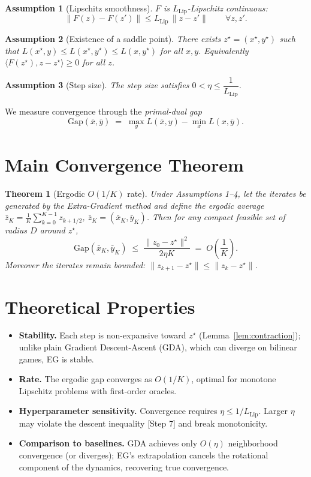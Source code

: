 \documentclass{article}
\newtheorem{theorem}{Theorem}
\newtheorem{assumption}{Assumption}
\begin{document}
\begin{assumption}[Lipschitz smoothness]
$F$ is $L_{\mathrm{Lip}}$-Lipschitz continuous:
\[
\| F(z) - F(z') \| \leq L_{\mathrm{Lip}} \, \| z - z' \| \qquad \forall z,z'.
\]
\end{assumption}

\begin{assumption}[Existence of a saddle point]
There exists $z^\star=(x^\star,y^\star)$ such that
$L(x^\star,y) \le L(x^\star,y^\star) \le L(x,y^\star)$ for all $x,y$.
Equivalently $\langle F(z^\star), z-z^\star\rangle \ge 0$ for all $z$.
\end{assumption}

\begin{assumption}[Step size]
The step size satisfies $0 < \eta \le \dfrac{1}{L_{\mathrm{Lip}}}$.
\end{assumption}

\noindent We measure convergence through the \emph{primal-dual gap}
\[
\mathrm{Gap}(\bar x,\bar y) \;=\;
\max_{y} L(\bar x, y) - \min_{x} L(x, \bar y).
\]

\section*{Main Convergence Theorem}

\begin{theorem}[Ergodic $O(1/K)$ rate]
\label{thm:main}
Under Assumptions 1--4, let the iterates be generated by the
Extra-Gradient method and define the ergodic average
$\bar z_K = \frac{1}{K}\sum_{k=0}^{K-1} z_{k+1/2}$, $\bar z_K=(\bar x_K,\bar y_K)$.
Then for any compact feasible set of radius $D$ around $z^\star$,
\[
\mathrm{Gap}(\bar x_K, \bar y_K)
\;\le\; \frac{\| z_0 - z^\star \|^2}{2\eta K}
\;=\; O\!\left(\frac{1}{K}\right).
\]
Moreover the iterates remain bounded:
$\|z_{k+1}-z^\star\| \le \|z_k - z^\star\|$.
\end{theorem}

\section*{Theoretical Properties}

\begin{itemize}
\item \textbf{Stability.} Each step is non-expansive toward $z^\star$
(Lemma~\ref{lem:contraction}); unlike plain Gradient Descent-Ascent (GDA),
which can diverge on bilinear games, EG is stable.
\item \textbf{Rate.} The ergodic gap converges as $O(1/K)$, optimal for
monotone Lipschitz problems with first-order oracles.
\item \textbf{Hyperparameter sensitivity.} Convergence requires
$\eta \le 1/L_{\mathrm{Lip}}$. Larger $\eta$ may violate the descent
inequality [Step 7] and break monotonicity.
\item \textbf{Comparison to baselines.} GDA achieves only $O(\eta)$
neighborhood convergence (or diverges); EG's extrapolation cancels the
rotational component of the dynamics, recovering true convergence.
\end{itemize}
\end{document}
